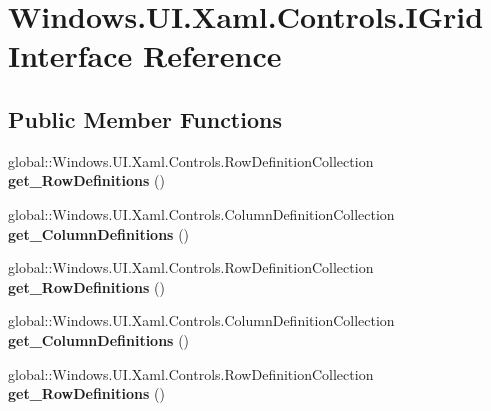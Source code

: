 \hypertarget{interface_windows_1_1_u_i_1_1_xaml_1_1_controls_1_1_i_grid}{}\section{Windows.\+U\+I.\+Xaml.\+Controls.\+I\+Grid Interface Reference}
\label{interface_windows_1_1_u_i_1_1_xaml_1_1_controls_1_1_i_grid}
\subsection*{Public Member Functions}
\begin{DoxyCompactItemize}
\item 
\mbox{\label{interface_windows_1_1_u_i_1_1_xaml_1_1_controls_1_1_i_grid_a4b3e4f22eaf0b903f03abfab1c6fac6d}} 
global\+::\+Windows.\+U\+I.\+Xaml.\+Controls.\+Row\+Definition\+Collection {\bfseries get\+\_\+\+Row\+Definitions} ()
\item 
\mbox{\label{interface_windows_1_1_u_i_1_1_xaml_1_1_controls_1_1_i_grid_afb59fceb5168bebefd9e755bce303150}} 
global\+::\+Windows.\+U\+I.\+Xaml.\+Controls.\+Column\+Definition\+Collection {\bfseries get\+\_\+\+Column\+Definitions} ()
\item 
\mbox{\label{interface_windows_1_1_u_i_1_1_xaml_1_1_controls_1_1_i_grid_a4b3e4f22eaf0b903f03abfab1c6fac6d}} 
global\+::\+Windows.\+U\+I.\+Xaml.\+Controls.\+Row\+Definition\+Collection {\bfseries get\+\_\+\+Row\+Definitions} ()
\item 
\mbox{\label{interface_windows_1_1_u_i_1_1_xaml_1_1_controls_1_1_i_grid_afb59fceb5168bebefd9e755bce303150}} 
global\+::\+Windows.\+U\+I.\+Xaml.\+Controls.\+Column\+Definition\+Collection {\bfseries get\+\_\+\+Column\+Definitions} ()
\item 
\mbox{\label{interface_windows_1_1_u_i_1_1_xaml_1_1_controls_1_1_i_grid_a4b3e4f22eaf0b903f03abfab1c6fac6d}} 
global\+::\+Windows.\+U\+I.\+Xaml.\+Controls.\+Row\+Definition\+Collection {\bfseries get\+\_\+\+Row\+Definitions} ()

\end{DoxyCompactItemize}
